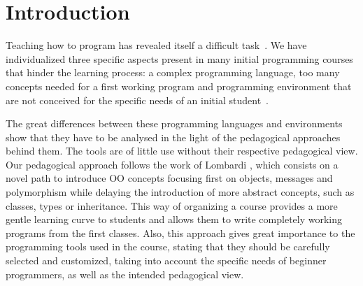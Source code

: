\section{Introduction}
\label{sec:intro}



Teaching how to program has revealed itself a difficult task~\cite{dijkstra_89a, jenkins2002difficulty}.
We have individualized three specific aspects present in many initial programming courses that hinder  the learning process: 
a complex programming language,
too many concepts needed for a first working program and
programming environment that are not conceived for the specific needs of an initial student~\cite{singh2012}.




\medskip

The great differences between these programming languages and environments show that they have to be analysed in the light of the pedagogical approaches behind them.
The tools are of little use without their respective pedagogical view.
Our pedagogical approach follows the work of Lombardi \etal
\cite{lombardi_instances_2007,lombardi_carlos_alumnos_2008,griggio_programming_2011,spigariol_lucas_ensenando_2013,passerini2017wollok}, 
which consists on a novel path to introduce OO concepts focusing first on objects, messages and polymorphism 
while delaying the introduction of more abstract concepts,
such as classes, types or inheritance.
This way of organizing a course provides a more gentle learning curve to students and allows them to write completely working programs from the first classes.
Also, this approach gives great importance to the programming tools used in the course, 
stating that they should be carefully selected and customized, 
taking into account the specific needs of beginner programmers,
as well as the intended pedagogical view.

